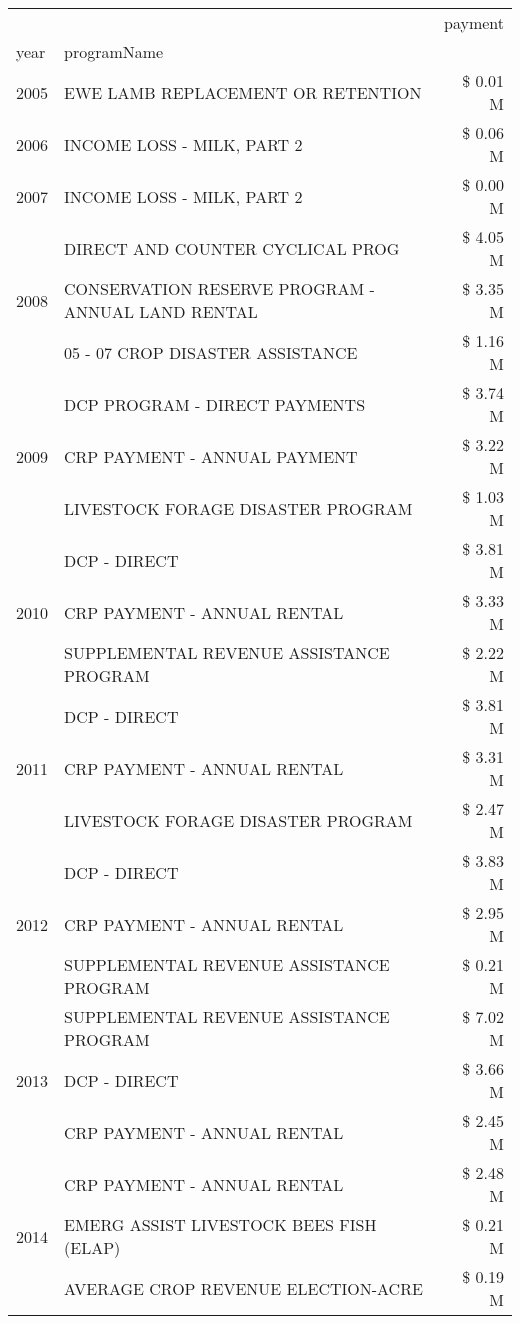 \begin{tabular}{llr}
\toprule
 &  & payment \\
year & programName &  \\
\midrule
2005 & EWE LAMB REPLACEMENT OR RETENTION & \$ 0.01 M \\
\cline{1-3}
2006 & INCOME LOSS - MILK, PART 2 & \$ 0.06 M \\
\cline{1-3}
2007 & INCOME LOSS - MILK, PART 2 & \$ 0.00 M \\
\cline{1-3}
\multirow[t]{3}{*}{2008} & DIRECT AND COUNTER CYCLICAL PROG & \$ 4.05 M \\
 & CONSERVATION RESERVE PROGRAM - ANNUAL LAND RENTAL & \$ 3.35 M \\
 & 05 - 07 CROP DISASTER ASSISTANCE & \$ 1.16 M \\
\cline{1-3}
\multirow[t]{3}{*}{2009} & DCP PROGRAM - DIRECT PAYMENTS & \$ 3.74 M \\
 & CRP PAYMENT - ANNUAL PAYMENT & \$ 3.22 M \\
 & LIVESTOCK FORAGE DISASTER  PROGRAM & \$ 1.03 M \\
\cline{1-3}
\multirow[t]{3}{*}{2010} & DCP - DIRECT & \$ 3.81 M \\
 & CRP PAYMENT - ANNUAL RENTAL & \$ 3.33 M \\
 & SUPPLEMENTAL REVENUE ASSISTANCE PROGRAM & \$ 2.22 M \\
\cline{1-3}
\multirow[t]{3}{*}{2011} & DCP - DIRECT & \$ 3.81 M \\
 & CRP PAYMENT - ANNUAL RENTAL & \$ 3.31 M \\
 & LIVESTOCK FORAGE DISASTER PROGRAM & \$ 2.47 M \\
\cline{1-3}
\multirow[t]{3}{*}{2012} & DCP - DIRECT & \$ 3.83 M \\
 & CRP PAYMENT - ANNUAL RENTAL & \$ 2.95 M \\
 & SUPPLEMENTAL REVENUE ASSISTANCE PROGRAM & \$ 0.21 M \\
\cline{1-3}
\multirow[t]{3}{*}{2013} & SUPPLEMENTAL REVENUE ASSISTANCE PROGRAM & \$ 7.02 M \\
 & DCP - DIRECT & \$ 3.66 M \\
 & CRP PAYMENT - ANNUAL RENTAL & \$ 2.45 M \\
\cline{1-3}
\multirow[t]{3}{*}{2014} & CRP PAYMENT - ANNUAL RENTAL & \$ 2.48 M \\
 & EMERG ASSIST LIVESTOCK BEES FISH (ELAP) & \$ 0.21 M \\
 & AVERAGE CROP REVENUE ELECTION-ACRE & \$ 0.19 M \\

\end{tabular}
